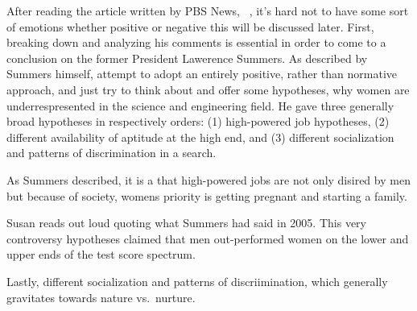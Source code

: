 \par
After reading the article written by PBS News, ~\cite{pbsnewshour}, 
it's hard not to have some sort of emotions whether positive or negative 
this will be discussed later. First, breaking down and analyzing his 
comments is essential in order to come to a conclusion on the former 
President Lawerence Summers. As described by Summers himself, 
attempt to adopt an entirely positive, rather than normative
approach, and just try to think about and offer some hypotheses,
why women are underrespresented in the science and engineering field.
He gave three generally broad hypotheses in respectively orders:
(1) high-powered job hypotheses, (2) different availability of aptitude 
at the high end, and (3) different socialization and patterns of 
discrimination in a search.

\par
As Summers described, it is a  that high-powered jobs
are not only disired by men but because of society, womens priority is 
getting pregnant and starting a family.

\par
{} Susan reads out loud 
quoting what Summers had said in 2005. This very controversy hypotheses claimed that
men out-performed women on the lower and upper ends of the test score spectrum.

\par
Lastly, different socialization and patterns of discriimination, which generally
gravitates towards nature vs.\ nurture.